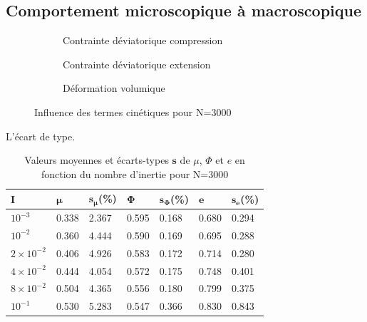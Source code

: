 \documentclass[5p,authoryear,square]{elsarticle}
\begin{document}
\subsection{Comportement microscopique à macroscopique}\label{figureMuy}
\begin{figure}[htbp]
    \centering
    \begin{subfigure}[b]{0.45\textwidth}
        \centering
        \scalebox{0.5}{}
        \caption{Contrainte déviatorique compression}
        \label{fig:3000_kinetic_q}
    \end{subfigure}
        \begin{subfigure}[b]{0.45\textwidth}
                        \centering
        \scalebox{0.5}{}
        \caption{Contrainte déviatorique extension}
        \label{fig:3000_kinetic_q}
    \end{subfigure}
    \begin{subfigure}[b]{0.45\textwidth}
                    \centering
        \scalebox{0.5}{}
        \caption{Déformation volumique}
        \label{fig:3000_kinetic_ev}
    \end{subfigure}
    \caption{Influence des termes cinétiques pour N=3000}
    \label{fig:3000_kinetic_comp}
\end{figure}
L'écart de type.

\begin{table}[htbp]
\centering
\small
\begin{tabular}{@{}lllllll@{}}
\toprule
\textbf{I} & $\boldsymbol{\mu}$ & $\boldsymbol{s_{\mu}}$(\%) & $\boldsymbol{\Phi}$ & $\boldsymbol{s_{\Phi}}$(\%) & $\boldsymbol{e}$ & $\boldsymbol{s_{e}}$(\%) \\
\midrule
$10^{-3}$ & 0.338 & 2.367 & 0.595 & 0.168 & 0.680 & 0.294 \\
$10^{-2}$ & 0.360 & 4.444 & 0.590 & 0.169 & 0.695 & 0.288 \\
$2 \times 10^{-2}$ & 0.406 & 4.926 & 0.583 & 0.172 & 0.714 & 0.280 \\
$4 \times 10^{-2}$ & 0.444 & 4.054 & 0.572 & 0.175 & 0.748 & 0.401 \\
$8 \times 10^{-2}$ & 0.504 & 4.365 & 0.556 & 0.180 & 0.799 & 0.375 \\
$10^{-1}$ & 0.530 & 5.283 & 0.547 & 0.366 & 0.830 & 0.843 \\
\bottomrule
\end{tabular}
\caption{Valeurs moyennes et écarts-types $\boldsymbol{s}$ de $\mu$, $\Phi$ et $e$ en fonction du nombre d'inertie pour N=3000}
\label{table_rheologie_stats}
\end{table}
\end{document}
